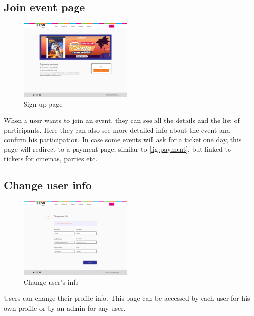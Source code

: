 \subsection{Join event page}
\begin{figure}[H]
    \centering
    \includegraphics[width=0.5\textwidth]{images/JoinEvent.png}
    \caption{Sign up page}
    \label{fig:joinEvent}
\end{figure}
When a user wants to join an event, they can see all the details and the list of participants. Here
they can also see more detailed info about the event and confirm his participation. In case some events
will ask for a ticket one day, this page will redirect to a payment page, similar to \ref{fig:payment},
but linked to tickets for cinemas, parties etc.
\subsection{Change user info}
\begin{figure}[H]
    \centering
    \includegraphics[width=0.5\textwidth]{images/ChangeUserDetail.png}
    \caption{Change user's info}
    \label{fig:change info}
\end{figure}
Users can change their profile info. This page can be accessed by each user for his own profile or
by an admin for any user.